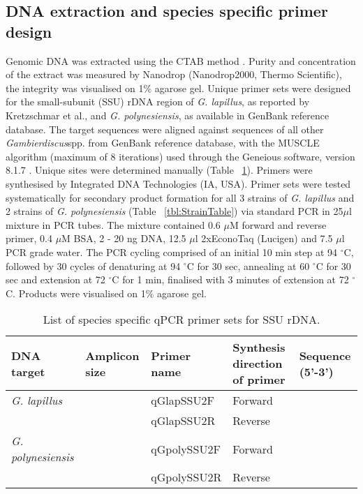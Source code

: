 \documentclass[12pt]{article}
\begin{document}
\subsection{DNA extraction and species specific primer design}
Genomic DNA was extracted using the CTAB method \citep{zhou1999analysis}. Purity and concentration of the extract was measured by Nanodrop (Nanodrop2000, Thermo Scientific), the integrity was visualised on 1\% agarose gel.
Unique primer sets were designed for the small-subunit (SSU) rDNA region of \emph{G. lapillus}, as reported by Kretzschmar et al., and \emph{G. polynesiensis}, as available in GenBank reference database. The target sequences were aligned against sequences of all other \emph{Gambierdiscus}spp. from GenBank reference database, with the MUSCLE algorithm (maximum of 8 iterations) \citep{edgar2004muscle} used through the Geneious software, version 8.1.7 \citep{kearse2012geneious}. Unique sites were determined manually (Table ~\ref{tbl:PrimerTable}). Primers were synthesised by Integrated DNA Technologies (IA, USA).
Primer sets were tested systematically for secondary product formation for all 3 strains of \emph{G. lapillus} and 2 strains of \emph{G. polynesiensis} (Table ~\ref{tbl:StrainTable}) via standard PCR in 25$\mu$l mixture in PCR tubes. The mixture contained 0.6 $\mu$M forward and reverse primer, 0.4 $\mu$M BSA, 2 - 20 ng DNA, 12.5 $\mu$l 2xEconoTaq (Lucigen) and 7.5 $\mu$l PCR grade water.
The PCR cycling comprised of an initial 10 min step at 94 $^{\circ}$C, followed by 30 cycles of denaturing at 94 $^{\circ}$C for 30 sec, annealing at 60 $^{\circ}$C for 30 sec and extension at 72 $^{\circ}$C for 1 min, finalised with 3 minutes of extension at 72 $^{\circ}$C. Products were visualised on 1\% agarose gel.
\FloatBarrier
\begin{table}
\caption{List of species specific qPCR primer sets for SSU rDNA.}
\label{tbl:PrimerTable}
\begin{tabular}{ | p{2cm} | p{2cm} | p{2cm} | p{2cm} | p{7cm} | }
\hline
\textbf{DNA target} & \textbf{Amplicon size} & \textbf{Primer name} & \textbf{Synthesis direction of primer} & \textbf{Sequence (5'-3')} \\
\hline
\emph{G. lapillus} & &qGlapSSU2F & Forward & \\
\hline
& &qGlapSSU2R & Reverse & \\
\hline
\emph{G. polynesiensis}& &qGpolySSU2F& Forward & \\
\hline
& &qGpolySSU2R & Reverse & \\
\hline
\end{tabular}
\end{table}
\end{document}

